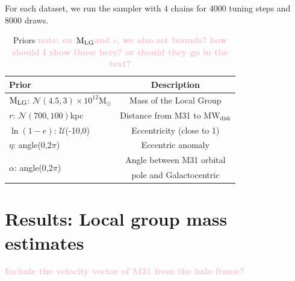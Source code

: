 \documentclass[twocolumn]{aastex631}
\newcommand{\kc}[1]{\textcolor{pink}{\textbf{#1}} }
\newcommand{\mlg}{\ensuremath{\textrm{M}_{\rm LG}}}
\newcommand{\msun}{\ensuremath{\textrm{M}_{\odot}}}
\newcommand{\mwdisk}{\ensuremath{\textrm{MW}_\textrm{disk}}}
\begin{document}
For each dataset, we run the sampler with 4 chains for 4000 tuning steps and
8000 draws.


\begin{table}
  \centering
  \begin{tabular}{lc}
  \hline\hline
  Prior  & Description \\\hline
  \mlg: $\mathcal{N}(4.5,3)\times10^{12}\msun$ & Mass of the Local Group\\
  $r$: $\mathcal{N}(700,100)$kpc & Distance from M31 to $\mwdisk$\\
  $\ln(1-e)$: $\mathcal{U}$(-10,0) & Eccentricity (close to 1) \\
  $\eta$: angle(0,2$\pi$)& Eccentric anomaly\\
  \multirow{2}{*}{$\alpha$: angle(0,2$\pi$)} & Angle between M31 orbital\\
  & pole and Galactocentric\\
  \hline\hline
  \end{tabular}
  \caption{\label{table:priors}Priors \kc{note: on \mlg and $r$, we also set bounds? how should I show those here? or should they go in the text?}}
\end{table}


\section{Results: Local group mass estimates}
\label{sec:results}
\kc{Include the velocity vector of M31 from the halo frame?}
\end{document}
